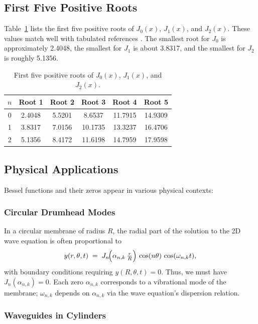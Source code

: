 \documentclass{article}
\begin{document}
\subsection{First Five Positive Roots}

Table~\ref{tab:roots} lists the first five positive roots of $J_0(x)$, $J_1(x)$, 
and $J_2(x)$. These values match well with tabulated references 
\citep{Olver2010}. The smallest root for $J_0$ is approximately 2.4048, the 
smallest for $J_1$ is about 3.8317, and the smallest for $J_2$ is roughly 5.1356.

\begin{table}[ht]
\centering
\caption{First five positive roots of $J_0(x)$, $J_1(x)$, and $J_2(x)$.}
\label{tab:roots}
\begin{tabular}{c c c c c c}
\hline\hline
$n$ & Root 1 & Root 2 & Root 3 & Root 4 & Root 5 \\
\hline
0 & 2.4048 & 5.5201 & 8.6537 & 11.7915 & 14.9309 \\
1 & 3.8317 & 7.0156 & 10.1735 & 13.3237 & 16.4706 \\
2 & 5.1356 & 8.4172 & 11.6198 & 14.7959 & 17.9598 \\
\hline
\end{tabular}
\end{table}

\subsection{Physical Applications}

Bessel functions and their zeros appear in various physical contexts:

\subsubsection{Circular Drumhead Modes}

In a circular membrane of radius $R$, the radial part of the solution to the 
2D wave equation is often proportional to
\begin{equation}
y(r, \theta, t) \;=\; J_n\!\Bigl(\alpha_{n,k}\,\tfrac{r}{R}\Bigr)\,\cos(n\theta)\,\cos(\omega_{n,k}t),
\end{equation}
with boundary conditions requiring $y(R,\theta,t)=0$. Thus, we must have 
$J_n(\alpha_{n,k})=0$. Each zero $\alpha_{n,k}$ corresponds to a vibrational 
mode of the membrane; $\omega_{n,k}$ depends on $\alpha_{n,k}$ via the wave 
equation's dispersion relation.

\subsubsection{Waveguides in Cylinders}
\end{document}
